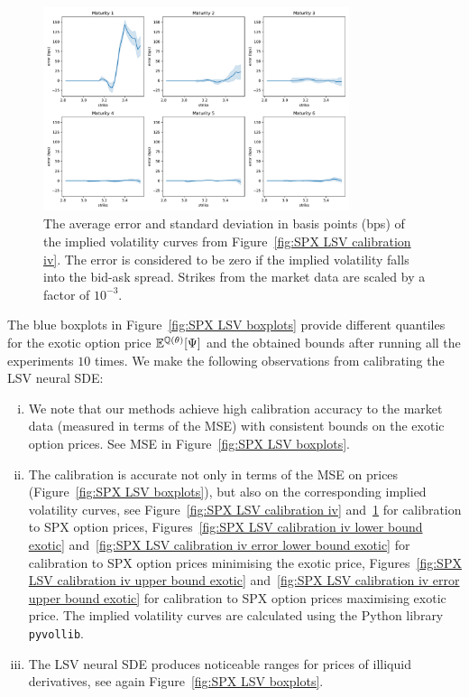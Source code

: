 \begin{figure}[htbp]
  \centering 
	\includegraphics[clip, width=0.8\textwidth]{content/reschap1/Figures/figures_SPX/iv_error_unbounded.pdf}
  \caption{The average error and standard deviation in basis points (bps) of the implied volatility curves from Figure~\ref{fig:SPX LSV calibration iv}. The error is considered to be zero if the implied volatility falls into the bid-ask spread. Strikes from the market data are scaled by a factor of $10^{-3}$.  
}
\label{fig:SPX LSV calibration iv error}  
\end{figure}

The blue boxplots in Figure~\ref{fig:SPX LSV boxplots} provide different quantiles for the exotic option 
 price $\mathbb{E}^{\mathbb{Q}(\theta)}[\Psi]$ and the obtained bounds after running all the experiments $10$ times. 
We make the following observations from calibrating the LSV neural SDE:

\begin{enumerate}[i)]
\item We note that our methods achieve high calibration accuracy to the market data (measured in terms of the MSE) with consistent bounds on the exotic option prices. See MSE in Figure~\ref{fig:SPX LSV boxplots}.
\item The calibration is accurate not only in terms of the MSE on prices (Figure~\ref{fig:SPX LSV boxplots}), but also on the corresponding implied volatility curves, see Figure~\ref{fig:SPX LSV calibration iv} and~\ref{fig:SPX LSV calibration iv error} for calibration to SPX option prices, Figures~\ref{fig:SPX LSV calibration iv lower bound exotic} and~\ref{fig:SPX LSV calibration iv error lower bound exotic} for calibration to SPX option prices minimising the exotic price, Figures~\ref{fig:SPX LSV calibration iv upper bound exotic} and~\ref{fig:SPX LSV calibration iv error upper bound exotic} for calibration to SPX option prices maximising exotic price. The implied volatility curves are calculated using the Python library \texttt{pyvollib}.
\item The LSV neural SDE produces noticeable ranges for prices of illiquid derivatives, see again Figure~\ref{fig:SPX LSV boxplots}.  
\end{enumerate}

